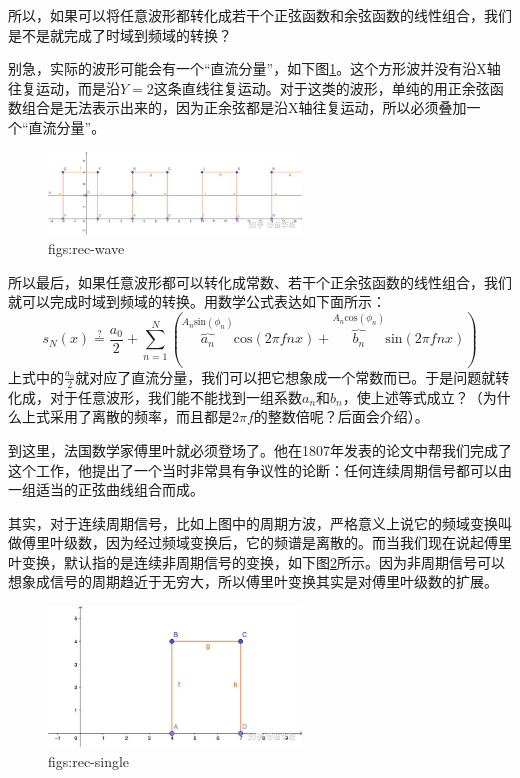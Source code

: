 \documentclass[lang=cn,11pt,a4paper,cite=numbers]{elegantpaper}
\begin{document}
  所以，如果可以将任意波形都转化成若干个正弦函数和余弦函数的线性组合，我们是不是就完成了时域到频域的转换？

  别急，实际的波形可能会有一个“直流分量”，如下图\ref{figs:rec-wave}。这个方形波并没有沿X轴往复运动，而是沿$Y=2$这条直线往复运动。对于这类的波形，单纯的用正余弦函数组合是无法表示出来的，因为正余弦都是沿X轴往复运动，所以必须叠加一个“直流分量”。
\begin{figure}[!htb]
  \centering
  \includegraphics[width=0.6\textwidth]{figs/rec-wave.png}
  \caption{figs:rec-wave}
  \label{figs:rec-wave}
\end{figure}

  所以最后，如果任意波形都可以转化成常数、若干个正余弦函数的线性组合，我们就可以完成时域到频域的转换。用数学公式表达如下面所示：
\begin{equation}
  s_{N}(x)\overset{?}{=}\frac{a_{0}}{2}+\sum_{n=1}^{N}\left(\overbrace{a_{n}}^{A_{n}\mathrm{sin}(\phi_{n})}\mathrm{cos}(2{\pi}fnx)+\overbrace{b_{n}}^{A_{n}\mathrm{cos}(\phi_{n})}\mathrm{sin}(2{\pi}fnx)\right)
\end{equation}
上式中的$\frac{a_{0}}{2}$就对应了直流分量，我们可以把它想象成一个常数而已。于是问题就转化成，对于任意波形，我们能不能找到一组系数$a_{n}$和$b_{n}$，使上述等式成立？（为什么上式采用了离散的频率，而且都是$2{\pi}f$的整数倍呢？后面会介绍）。

  到这里，法国数学家傅里叶就必须登场了。他在1807年发表的论文中帮我们完成了这个工作，他提出了一个当时非常具有争议性的论断：任何连续周期信号都可以由一组适当的正弦曲线组合而成。

  其实，对于连续周期信号，比如上图中的周期方波，严格意义上说它的频域变换叫做傅里叶级数，因为经过频域变换后，它的频谱是离散的。而当我们现在说起傅里叶变换，默认指的是连续非周期信号的变换，如下图\ref{figs:rec-single}所示。因为非周期信号可以想象成信号的周期趋近于无穷大，所以傅里叶变换其实是对傅里叶级数的扩展。
\begin{figure}[!htb]
  \centering
  \includegraphics[width=0.6\textwidth]{figs/rec-single.png}
  \caption{figs:rec-single}
  \label{figs:rec-single}
\end{figure}
\end{document}
